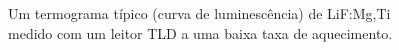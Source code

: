 \documentclass[11pt,a4paper]{article}
\begin{document}
	\begin{figure}[h]
		\centering
		\caption{Um termograma típico (curva de luminescência) de LiF:Mg,Ti medido com um leitor TLD a uma baixa taxa de aquecimento.}
		\label{fig:curvLiF}
	\end{figure}
\end{document}
